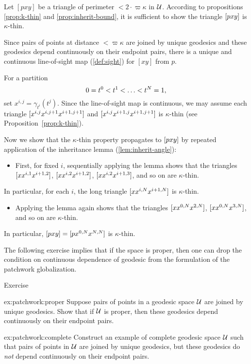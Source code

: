 Let $[p x y]$ be a triangle of perimeter $<2\cdot\varpi\kappa$  in $\mathcal{U}$. 
According to propositions \ref{prop:k-thin} and \ref{prop:inherit-bound}, it is sufficient to show the triangle $[{p}{x}{y}]$ is $\kappa$-thin.

Since pairs of points at distance $<\varpi\kappa$ are joined by unique geodesics and these geodesics depend continuously on their endpoint pairs, there is a unique and continuous line-of-sight map (\ref{def:sight}) for  $[x y]$ from $p$.    

For a partition \[0\z=t^0\z<t^1\z<\z\dots\z<t^N=1,\] 
set $x^{i,j}=\gamma_{t^i}(t^j)$. 
Since the line-of-sight map is continuous, we may assume each triangle $[{x^{i,j}}{x^{i,j+1}}{x^{i+1,j+1}}]$ and $[{x^{i,j}}{x^{i+1,j}}{x^{i+1,j+1}}]$ is $\kappa$-thin 
(see Proposition~\ref{prop:k-thin}).

Now we show that the $\kappa$-thin property propagates to $[{p}{x}{y}]$ by repeated application of the inheritance lemma (\ref{lem:inherit-angle}):
\begin{itemize}
\item 
First, for fixed $i$, 
sequentially applying the lemma shows  that the triangles 
$[{x}{x^{i,1}}{x^{i+1,2}}]$, 
$[{x}{x^{i,2}}{x^{i+1,2}}]$, 
$[{x}{x^{i,2}}{x^{i+1,3}}]$,
and so on are $\kappa$-thin. 
\end{itemize}
In particular, for each $i$, the long triangle $[{x}{x^{i,N}}{x^{i+1,N}}]$ is $\kappa$-thin.
\begin{itemize} 
\item 
Applying the lemma again shows that the  triangles $[{x}{x^{0,N}}{x^{2,N}}]$, $[{x}{x^{0,N}}{x^{3,N}}]$, and so on are $\kappa$-thin. 
\end{itemize}
In particular, $[{p}{x}{y}]=[{p}{x^{0,N}}{x^{N,N}}]$ is $\kappa$-thin.
\qeds

The following exercise implies that if the space is proper, then one can drop the condition on continuous dependence of geodesic from the formulation of the patchwork globalization.

\begin{thm}{Exercise}\label{ex:patchwork}
\begin{subthm}{ex:patchwork:proper}
Suppose pairs of points in a geodesic space $\mathcal{U}$ are joined by unique geodesics.
Show that if $\mathcal{U}$ is proper, then 
these geodesics depend continuously on their endpoint pairs.
\end{subthm}

\begin{subthm}{ex:patchwork:complete}
Construct an example of complete geodesic space $\mathcal{U}$ such that 
pairs of points in $\mathcal{U}$ are joined by unique geodesics, but
these geodesics do \emph{not} depend continuously on their endpoint pairs.
\end{subthm}
\end{thm}


